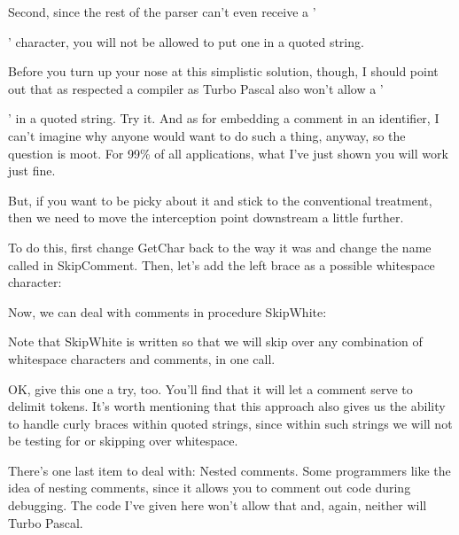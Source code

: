 \documentclass[float=false, crop=false]{standalone}
\begin{document}
Second, since the rest of the parser can't even receive a '{' character, you
will not be allowed to put one in a quoted string.

Before you turn up your nose at this simplistic solution, though, I should point
out that as respected a compiler as Turbo Pascal also won't allow a '{' in a
quoted string. Try it. And as for embedding a comment in an identifier, I can't
imagine why anyone would want to do such a thing, anyway, so the question is
moot. For 99\% of all applications, what I've just shown you will work just
fine.

But, if you want to be picky about it and stick to the conventional treatment,
then we need to move the interception point downstream a little further.

To do this, first change GetChar back to the way it was and change the name
called in SkipComment. Then, let's add the left brace as a possible whitespace
character:

\begin{code}
{--------------------------------------------------------------}
{ Recognize White Space }

function IsWhite(c: char): boolean;
begin
   IsWhite := c in [' ', TAB, CR, LF, '{'];
end;
{--------------------------------------------------------------}
\end{code}

Now, we can deal with comments in procedure SkipWhite:

\begin{code}
{--------------------------------------------------------------}
{ Skip Over Leading White Space }

procedure SkipWhite;
begin
   while IsWhite(Look) do begin
      if Look = '{' then
         SkipComment
      else
         GetChar;
   end;
end;
{--------------------------------------------------------------}
\end{code}

Note that SkipWhite is written so that we will skip over any combination of
whitespace characters and comments, in one call.

OK, give this one a try, too. You'll find that it will let a comment serve to
delimit tokens. It's worth mentioning that this approach also gives us the
ability to handle curly braces within quoted strings, since within such strings
we will not be testing for or skipping over whitespace.

There's one last item to deal with: Nested comments. Some programmers like the
idea of nesting comments, since it allows you to comment out code during
debugging. The code I've given here won't allow that and, again, neither will
Turbo Pascal.

}}
\end{document}
